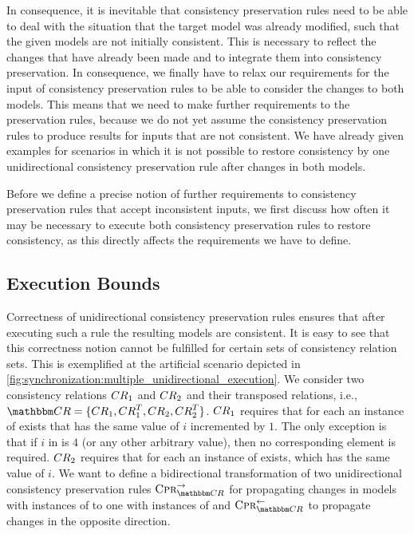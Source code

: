 In consequence, it is inevitable that consistency preservation rules need to be able to deal with the situation that the target model was already modified, such that the given models are not initially consistent.
This is necessary to reflect the changes that have already been made and to integrate them into consistency preservation.
In consequence, we finally have to relax our requirements for the input of consistency preservation rules to be able to consider the changes to both models.
This means that we need to make further requirements to the preservation rules, because we do not yet assume the consistency preservation rules to produce results for inputs that are not consistent.
We have already given examples for scenarios in which it is not possible to restore consistency by one unidirectional consistency preservation rule after changes in both models.

Before we define a precise notion of further requirements to consistency preservation rules that accept inconsistent inputs, we first discuss how often it may be necessary to execute both consistency preservation rules to restore consistency, as this directly affects the requirements we have to define.


\subsection{Execution Bounds}
\label{chap:synchronization:combination:bounds}

Correctness of unidirectional consistency preservation rules ensures that after executing such a rule the resulting models are consistent.
It is easy to see that this correctness notion cannot be fulfilled for certain sets of consistency relation sets.
This is exemplified at the artificial scenario depicted in \autoref{fig:synchronization:multiple_unidirectional_execution}.
We consider two consistency relations $\consistencyrelation{CR}{1}$ and $\consistencyrelation{CR}{2}$ and their transposed relations, i.e., $\consistencyrelationset{CR} = \setted{\consistencyrelation{CR}{1}, \consistencyrelation{CR}{1}^T, \consistencyrelation{CR}{2}, \consistencyrelation{CR}{2}^T}$.
$\consistencyrelation{CR}{1}$ requires that for each  an instance of  exists that has the same value of $i$ incremented by $1$.
The only exception is that if $i$ in  is $4$ (or any other arbitrary value), then no corresponding element  is required.
$\consistencyrelation{CR}{2}$ requires that for each  an instance of  exists, which has the same value of $i$.
We want to define a bidirectional transformation of two unidirectional consistency preservation rules $\consistencypreservationrule{\consistencyrelationset{CR}}^{\rightarrow}$ for propagating changes in models with instances of  to one with instances of  and $\consistencypreservationrule{\consistencyrelationset{CR}}^{\leftarrow}$ to propagate changes in the opposite direction. 

